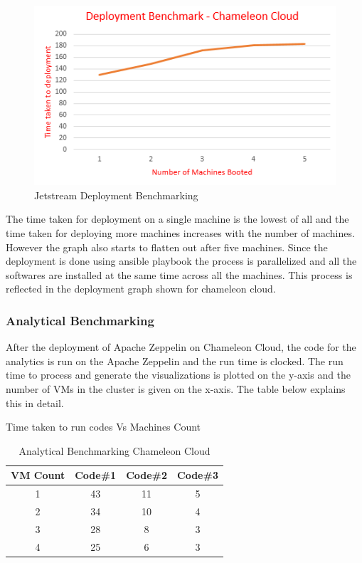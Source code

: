 \documentclass[9pt,twocolumn,twoside]{../../styles/osajnl}
\begin{document}
	\begin{figure}
		\includegraphics[width=\linewidth]{./images/chameleon_deployment_time}
		\caption{Jetstream Deployment Benchmarking}
		\label{fig:Chameleon Deployment Benchmarking}
	\end{figure}
	
	The time taken for deployment on a single machine is the lowest 
	of 
	all and the time taken for deploying more machines increases with 
	the 
	number of machines. However the graph also starts to flatten out 
	after five machines. Since the deployment is done using ansible 
	playbook the process is parallelized and all the softwares are 
	installed at the same time across all the machines. This 
	process 
	is reflected in the deployment graph shown for chameleon cloud.
	
	\subsubsection{Analytical Benchmarking}
	
	After the deployment of Apache Zeppelin on Chameleon Cloud, the 
	code 
	for the analytics is run on the Apache Zeppelin and the run time 
	is 
	clocked. The run time to process and generate the visualizations 
	is 
	plotted on the y-axis and the number of VMs in the cluster is 
	given 
	on the x-axis. The table below explains this in detail.
	
	\begin{table}[ht]
		\caption{Analytical Benchmarking Chameleon Cloud} %
		\centering %
		Time taken to run codes Vs Machines Count \\
		\begin{tabular}{c c c c} %
			\hline
			\hline %
			VM Count & Code\#1 & Code\#2 & Code\#3 \\ [0.5ex] %
			\hline %
			1 & 43 & 11 & 5 \\ %
			2 & 34 & 10 & 4 \\
			3 & 28 & 8 & 3 \\
			4 & 25 & 6 & 3 \\ [1ex] %
			\hline %
		\end{tabular}
		\label{table:nonlin} %
	\end{table}
	
\end{document}

